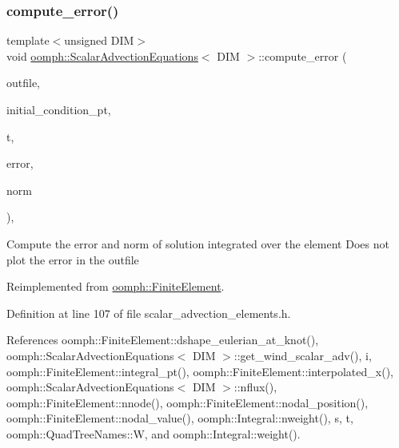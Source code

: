 \subsubsection{\texorpdfstring{compute\+\_\+error()}{compute\_error()}}
{\footnotesize\ttfamily template$<$unsigned D\+IM$>$ \\
void \hyperlink{classoomph_1_1ScalarAdvectionEquations}{oomph\+::\+Scalar\+Advection\+Equations}$<$ D\+IM $>$\+::compute\+\_\+error (\begin{DoxyParamCaption}\item[{std\+::ostream \&}]{outfile,  }\item[{\hyperlink{classoomph_1_1FiniteElement_ad4ecf2b61b158a4b4d351a60d23c633e}{Finite\+Element\+::\+Unsteady\+Exact\+Solution\+Fct\+Pt}}]{initial\+\_\+condition\+\_\+pt,  }\item[{const double \&}]{t,  }\item[{\hyperlink{classoomph_1_1Vector}{Vector}$<$ double $>$ \&}]{error,  }\item[{\hyperlink{classoomph_1_1Vector}{Vector}$<$ double $>$ \&}]{norm }\end{DoxyParamCaption})\hspace{0.3cm}{\ttfamily [inline]}, {\ttfamily [virtual]}}

Compute the error and norm of solution integrated over the element Does not plot the error in the outfile 

Reimplemented from \hyperlink{classoomph_1_1FiniteElement_a6c1220af04b60c1a1c34b44495188daf}{oomph\+::\+Finite\+Element}.



Definition at line 107 of file scalar\+\_\+advection\+\_\+elements.\+h.



References oomph\+::\+Finite\+Element\+::dshape\+\_\+eulerian\+\_\+at\+\_\+knot(), oomph\+::\+Scalar\+Advection\+Equations$<$ D\+I\+M $>$\+::get\+\_\+wind\+\_\+scalar\+\_\+adv(), i, oomph\+::\+Finite\+Element\+::integral\+\_\+pt(), oomph\+::\+Finite\+Element\+::interpolated\+\_\+x(), oomph\+::\+Scalar\+Advection\+Equations$<$ D\+I\+M $>$\+::nflux(), oomph\+::\+Finite\+Element\+::nnode(), oomph\+::\+Finite\+Element\+::nodal\+\_\+position(), oomph\+::\+Finite\+Element\+::nodal\+\_\+value(), oomph\+::\+Integral\+::nweight(), s, t, oomph\+::\+Quad\+Tree\+Names\+::W, and oomph\+::\+Integral\+::weight().

\mbox{\label{classoomph_1_1ScalarAdvectionEquations_af0073678c951417d6497ea0c772b30dc}} 
